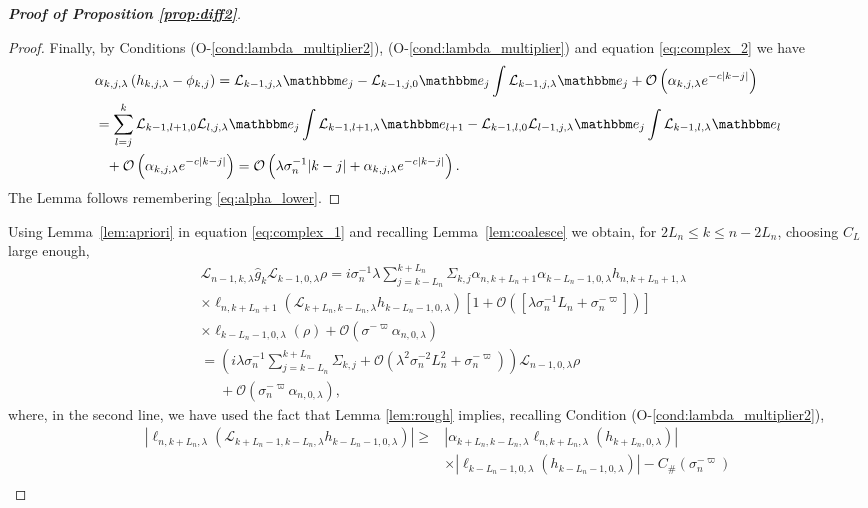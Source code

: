 \documentclass{amsart}
\numberwithin{equation}{section}
\newcommand\cL{{\mathcal L}}
\newcommand\cO{{\mathcal O}}
\newcommand{\bbe}{\mathbbm e}
\newcommand{\Const}{C_{\#}}
\begin{document}
\begin{proof}[\bf \em  Proof of Proposition \ref{prop:diff2}]
\begin{proof}
Finally, by Conditions (O-\ref{cond:lambda_multiplier2}), (O-\ref{cond:lambda_multiplier}) and equation \eqref{eq:complex_2} we have
\[
\begin{split}
&\alpha_{k,j,\lambda} \left(h_{k,j,\lambda}-\phi_{k,j}\right)=\cL_{k-1,j,\lambda}\bbe_j-\cL_{k-1,j,0}\bbe_j\int\cL_{k-1,j,\lambda}\bbe_j+\cO\left(\alpha_{k,j,\lambda} e^{-c|k-j|}\right)\\
&=\sum_{l=j}^{k}\cL_{k-1,l+1,0}\cL_{l,j,\lambda}\bbe_j\int\cL_{k-1,l+1,\lambda}\bbe_{l+1}-\cL_{k-1,l,0}\cL_{l-1,j,\lambda}\bbe_j\int\cL_{k-1,l,\lambda}\bbe_l\\
&\phantom{=}+\cO\left(\alpha_{k,j,\lambda} e^{-c|k-j|}\right)=\cO\left(\lambda \sigma_n^{-1}|k-j|+\alpha_{k,j,\lambda} e^{-c|k-j|}\right).
\end{split}
\]
The Lemma follows remembering \eqref{eq:alpha_lower}.
\end{proof}
Using Lemma~\ref{lem:apriori} in equation \eqref{eq:complex_1} and recalling Lemma~\ref{lem:coalesce} we obtain, for $2L_n\leq k\leq n-2L_n$, choosing $C_L$ large enough,
\begin{equation}\label{eq:final_complex prelim}
\begin{split}
&\cL_{n-1,k,\lambda}\hat g_k\cL_{k-1,0,\lambda}\rho=i\sigma_n^{-1}\lambda\!\!\! \sum_{j=k-L_n}^{k+L_n} \!\!\!\Sigma_{k,j}\alpha_{n,k+L_n+1}\alpha_{k-L_n-1,0,\lambda} h_{n,k+L_n+1,\lambda}\\
&\times \ell_{n,k+L_n+1}\left(\cL_{k+L_n,k-L_n,\lambda}h_{k-L_n-1,0,\lambda}\right)\left[ 1+\cO(\left[\lambda \sigma_n^{-1}L_n+\sigma_n^{-\varpi}\right])\right]\\
&\times\ell_{k-L_n-1,0,\lambda}(\rho)+\cO(\sigma^{-\varpi}\alpha_{n,0,\lambda})\\
&=\left(i\lambda\sigma_n^{-1}\!\!\!\sum_{j=k-L_n}^{k+L_n}\Sigma_{k,j}+\cO\left(\lambda^2\sigma_n^{-2}L_n^2+\sigma_n^{-\varpi}\right)\right)\cL_{ n-1,0,\lambda}\rho\\
&\phantom{=}
+\cO(\sigma_n^{-\varpi}\alpha_{n,0,\lambda}),
\end{split}
\end{equation}
where, in the second line, we have used the fact that Lemma \ref{lem:rough} implies, recalling Condition (O-\ref{cond:lambda_multiplier2}),
\[
\begin{split}
\left|\ell_{n,k+L_n,\lambda}(\cL_{k+L_n-1,k-L_n,\lambda}h_{k-L_n-1,0,\lambda})\right|\geq&\left|\alpha_{k+L_n,k-L_n,\lambda}\ell_{n,k+L_n,\lambda}(h_{k+L_n,0,\lambda})\right|\\
&\times\left| \ell_{k-L_n-1,0,\lambda}(h_{k-L_n-1,0,\lambda})\right|-\Const(\sigma_n^{-\varpi})\\

\end{split}\]
\end{proof}
\end{document}
